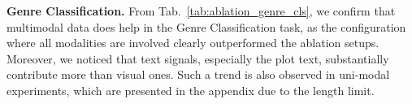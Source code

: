 

\noindent\textbf{Genre Classification.} From Tab.~\ref{tab:ablation_genre_cls}, we confirm that multimodal data does help in the Genre Classification task, as the configuration where all modalities are involved clearly outperformed the ablation setups. 
Moreover, we noticed that text signals, especially the plot text, substantially contribute more than visual ones. Such a trend is also observed in uni-modal experiments, which are presented in the appendix due to the length limit.

